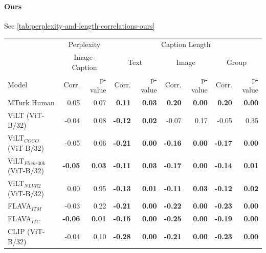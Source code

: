 \paragraph{Ours}

See \cref{tab:perplexity-and-length-correlations-ours}

\begin{table}[ht]
\centering
\begin{adjustbox}{max width=\textwidth}
\begin{tabular}{l|rr|rrrrrr}
\toprule
 & \multicolumn{2}{c|}{Perplexity} &  \multicolumn{6}{c}{Caption Length}\\
 & \multicolumn{2}{c|}{Image-Caption} &  \multicolumn{2}{c}{Text} &  \multicolumn{2}{c}{Image} &  \multicolumn{2}{c}{Group}\\
 Model      &   Corr. &   p-value & Corr. &   p-value & Corr. &   p-value & Corr. &   p-value\\\midrule 
MTurk Human                         & 0.05           & 0.07          & \textbf{0.11}  & \textbf{0.03} & \textbf{0.20}  & \textbf{0.00} & \textbf{0.20}  & \textbf{0.00} \\
 ViLT (ViT-B/32)                     & -0.04          & 0.08          & \textbf{-0.12} & \textbf{0.02} & -0.07          & 0.17          & -0.05          & 0.35          \\
 ViLT$_{COCO}$ (ViT-B/32)            & -0.05          & 0.06          & \textbf{-0.21} & \textbf{0.00} & \textbf{-0.16} & \textbf{0.00} & \textbf{-0.17} & \textbf{0.00} \\
 ViLT$_{Flickr30k}$ (ViT-B/32)       & \textbf{-0.05} & \textbf{0.03} & \textbf{-0.11} & \textbf{0.03} & \textbf{-0.17} & \textbf{0.00} & \textbf{-0.14} & \textbf{0.01} \\
 ViLT$_{NLVR2}$ (ViT-B/32)           & 0.00           & 0.95          & \textbf{-0.13} & \textbf{0.01} & \textbf{-0.11} & \textbf{0.03} & \textbf{-0.12} & \textbf{0.02} \\
 FLAVA$_{ITM}$                       & -0.03          & 0.22          & \textbf{-0.21} & \textbf{0.00} & \textbf{-0.22} & \textbf{0.00} & \textbf{-0.23} & \textbf{0.00} \\
 FLAVA$_{ITC}$                       & \textbf{-0.06} & \textbf{0.01} & \textbf{-0.15} & \textbf{0.00} & \textbf{-0.25} & \textbf{0.00} & \textbf{-0.19} & \textbf{0.00} \\
 CLIP (ViT-B/32)                     & -0.04          & 0.10          & \textbf{-0.28} & \textbf{0.00} & \textbf{-0.21} & \textbf{0.00} & \textbf{-0.23} & \textbf{0.00} \\

\end{tabular}
\end{adjustbox}
\end{table}
